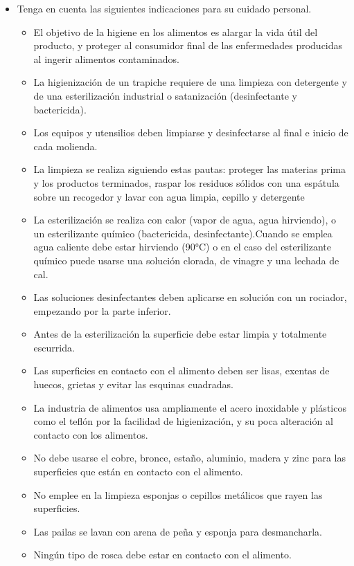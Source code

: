 \documentclass{article}%
\begin{document}
\begin{large}
\begin{itemize}%
\item%
Tenga en cuenta las siguientes indicaciones para su cuidado personal.%
\begin{itemize}%
\item%
El objetivo de la higiene en los alimentos es alargar la vida útil del producto, y proteger al consumidor final de las enfermedades producidas al ingerir alimentos contaminados.%
\item%
La higienización de un trapiche requiere de una limpieza con detergente y de una esterilización industrial o satanización (desinfectante y bactericida).%
\item%
Los equipos y utensilios deben limpiarse y desinfectarse al final e inicio de cada molienda.%
\item%
La limpieza se realiza siguiendo estas pautas: proteger las materias prima y los productos terminados, raspar los residuos sólidos con una espátula sobre un recogedor y lavar con agua limpia, cepillo y detergente%
\item%
La esterilización se realiza con calor (vapor de agua, agua hirviendo), o un esterilizante químico (bactericida, desinfectante).Cuando se emplea agua caliente debe estar hirviendo (90°C) o en el caso del esterilizante químico puede usarse una solución clorada, de vinagre y una lechada de cal.%
\item%
Las soluciones desinfectantes deben aplicarse en solución con un rociador, empezando por la parte inferior.%
\item%
Antes de la esterilización la superficie debe estar limpia y totalmente escurrida.%
\item%
Las superficies en contacto con el alimento deben ser lisas, exentas de huecos, grietas y evitar las esquinas cuadradas.%
\item%
La industria de alimentos usa ampliamente el acero inoxidable y plásticos como el teflón por la facilidad de higienización, y su poca alteración al contacto con los alimentos.%
\item%
No debe usarse el cobre, bronce, estaño, aluminio, madera y zinc para las superficies que están en contacto con el alimento.%
\item%
No emplee en la limpieza esponjas o cepillos metálicos que rayen las superficies.%
\item%
Las pailas se lavan con arena de peña y esponja para desmancharla.%
\item%
Ningún tipo de rosca debe estar en contacto con el alimento.%

\end{itemize}
\end{itemize}
\end{large}
\end{document}
